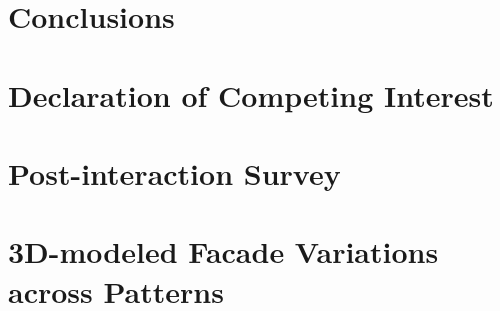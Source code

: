 \documentclass[final,5p,times]{elsarticle}%
\begin{document}
\begin{linenumbers}



\section{Conclusions}
\label{sec:Conclusion}



\section{Declaration of Competing Interest}
\label{sec:DeclarationInterest}


%

\end{linenumbers}




\newpage
\appendix


\section{Post-interaction Survey}
\label{sec:Annexsurvey}


\section{3D-modeled Facade Variations across Patterns}
\label{sec:AnnexVariations}

\end{document}
